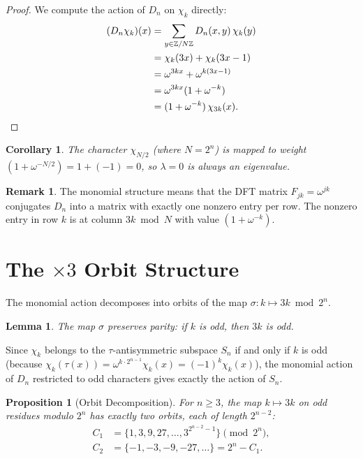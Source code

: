 \documentclass[11pt,reqno]{amsart}
\newtheorem{lemma}[theorem]{Lemma}
\newtheorem{proposition}[theorem]{Proposition}
\newtheorem{corollary}[theorem]{Corollary}
\theoremstyle{definition}
\newtheorem{remark}[theorem]{Remark}
\begin{document}
\begin{proof}
We compute the action of $D_n$ on $\chi_k$ directly:
\begin{align*}
(D_n \chi_k)(x) &= \sum_{y \in \mathbb{Z}/N\mathbb{Z}} D_n(x, y) \, \chi_k(y) \\
&= \chi_k(3x) + \chi_k(3x - 1) \\
&= \omega^{3kx} + \omega^{k(3x - 1)} \\
&= \omega^{3kx}(1 + \omega^{-k}) \\
&= (1 + \omega^{-k}) \, \chi_{3k}(x). \qedhere
\end{align*}
\end{proof}

\begin{corollary}\label{cor:weight-zero}
The character $\chi_{N/2}$ (where $N = 2^n$) is mapped to weight $(1 + \omega^{-N/2}) = 1 + (-1) = 0$, so $\lambda = 0$ is always an eigenvalue.
\end{corollary}

\begin{remark}
The monomial structure means that the DFT matrix $F_{jk} = \omega^{jk}$ conjugates $D_n$ into a matrix with exactly one nonzero entry per row. The nonzero entry in row $k$ is at column $3k \bmod N$ with value $(1 + \omega^{-k})$.
\end{remark}

\section{The $\times 3$ Orbit Structure}\label{sec:orbits}

The monomial action decomposes into orbits of the map $\sigma \colon k \mapsto 3k \bmod 2^n$.

\begin{lemma}\label{lem:parity}
The map $\sigma$ preserves parity: if $k$ is odd, then $3k$ is odd.
\end{lemma}

Since $\chi_k$ belongs to the $\tau$-antisymmetric subspace $S_n$ if and only if $k$ is odd (because $\chi_k(\tau(x)) = \omega^{k \cdot 2^{n-1}} \chi_k(x) = (-1)^k \chi_k(x)$), the monomial action of $D_n$ restricted to odd characters gives exactly the action of $S_n$.

\begin{proposition}[Orbit Decomposition]\label{prop:orbits}
For $n \ge 3$, the map $k \mapsto 3k$ on odd residues modulo $2^n$ has exactly two orbits, each of length $2^{n-2}$:
\begin{align*}
C_1 &= \{1, 3, 9, 27, \ldots, 3^{2^{n-2}-1}\} \pmod{2^n}, \\
C_2 &= \{-1, -3, -9, -27, \ldots\} = 2^n - C_1.
\end{align*}
\end{proposition}
\end{document}
